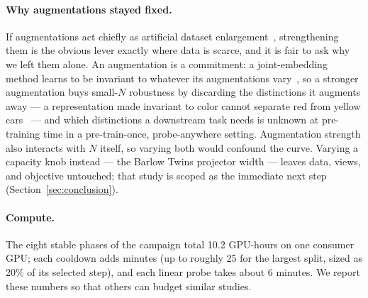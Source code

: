 \paragraph{Why augmentations stayed fixed.}
If augmentations act chiefly as artificial dataset
enlargement~\cite{moutakanni2024you}, strengthening them is the obvious
lever exactly where data is scarce, and it is fair to ask why we left them
alone. An augmentation is a commitment: a joint-embedding method learns to
be invariant to whatever its augmentations vary~\cite{xiao2021what}, so a
stronger augmentation buys small-$N$ robustness by discarding the
distinctions it augments away --- a representation made invariant to color
cannot separate red from yellow cars~\cite{xiao2021what} --- and which
distinctions a downstream task needs is unknown at pre-training time in a
pre-train-once, probe-anywhere setting. Augmentation strength also
interacts with $N$ itself, so varying both would confound the curve.
Varying a capacity knob instead --- the Barlow Twins projector width ---
leaves data, views, and objective untouched; that study is scoped as the
immediate next step (Section~\ref{sec:conclusion}).

\paragraph{Compute.}
The eight stable phases of the campaign total 10.2 GPU-hours on one
consumer GPU; each cooldown adds minutes (up to roughly 25 for the largest
split, sized as 20\% of its selected step), and each linear probe takes
about 6 minutes. We report these numbers so that others can budget similar
studies.
